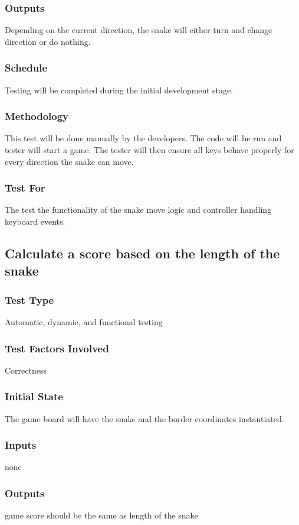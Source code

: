 \documentclass[12pt]{article}
\begin{document}
\subsubsection*{Outputs}
Depending on the current direction, the snake will either turn and change direction or do nothing.
\subsubsection*{Schedule}
Testing will be completed during the initial development stage.
\subsubsection*{Methodology}
This test will be done manually by the developers. The code will be run and tester will start a game. The tester will then ensure all keys behave properly for every direction the snake can move.
\subsubsection*{Test For}
The test the functionality of the snake move logic and controller handling keyboard events.\newline

\noindent
\subsection{Calculate a score based on the length of the snake}
\subsubsection*{Test Type}
Automatic, dynamic, and functional testing
\subsubsection*{Test Factors Involved}
Correctness
\subsubsection*{Initial State}
The game board will have the snake and the border coordinates instantiated.
\subsubsection*{Inputs}
none
\subsubsection*{Outputs}
game score should be the same as length of the snake
\end{document}
